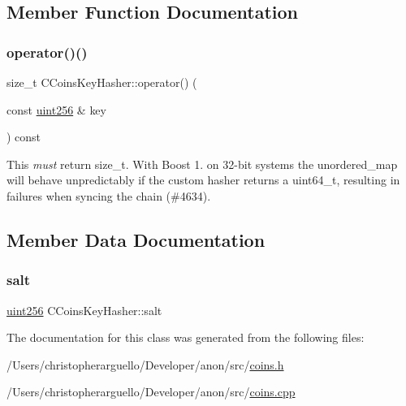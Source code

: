 \subsection{Member Function Documentation}
\mbox{\label{class_c_coins_key_hasher_abf805e5472a1a3c9c29f8f3f1dd013b3}} 
\subsubsection{\texorpdfstring{operator()()}{operator()()}}
{\footnotesize\ttfamily size\+\_\+t C\+Coins\+Key\+Hasher\+::operator() (\begin{DoxyParamCaption}\item[{const \mbox{\hyperlink{classuint256}{uint256}} \&}]{key }\end{DoxyParamCaption}) const\hspace{0.3cm}{\ttfamily [inline]}}

This {\itshape must} return size\+\_\+t. With Boost 1. on 32-\/bit systems the unordered\+\_\+map will behave unpredictably if the custom hasher returns a uint64\+\_\+t, resulting in failures when syncing the chain (\#4634). 

\subsection{Member Data Documentation}
\mbox{\label{class_c_coins_key_hasher_a142ac561b457a4d2df4506f5695a9adb}} 
\subsubsection{\texorpdfstring{salt}{salt}}
{\footnotesize\ttfamily \mbox{\hyperlink{classuint256}{uint256}} C\+Coins\+Key\+Hasher\+::salt\hspace{0.3cm}{\ttfamily [private]}}



The documentation for this class was generated from the following files\+:\begin{DoxyCompactItemize}
\item 
/\+Users/christopherarguello/\+Developer/anon/src/\mbox{\hyperlink{coins_8h}{coins.\+h}}\item 
/\+Users/christopherarguello/\+Developer/anon/src/\mbox{\hyperlink{coins_8cpp}{coins.\+cpp}}\end{DoxyCompactItemize}
